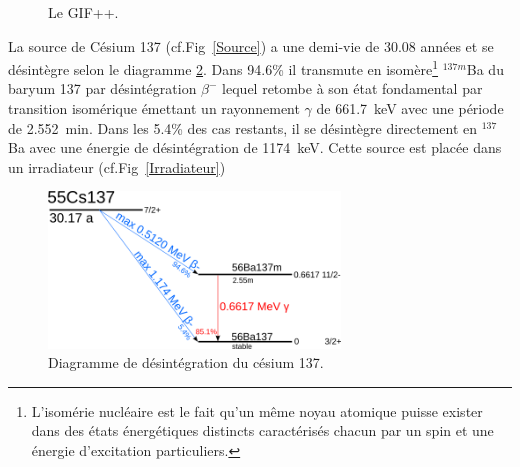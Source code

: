 \begin{figure}[ht!]
	\centering
	\hfill
	\caption{Le GIF++.}
	\label{GIF}
\end{figure}


La source de Césium \num{137} (cf.Fig~\ref{Source}) a une demi-vie de \num{30.08} années et se désintègre selon le diagramme \ref{Diagramme}. Dans \num{94.6}\% il transmute en isomère\footnote{L’isomérie nucléaire est le fait qu'un même noyau atomique puisse exister dans des états énergétiques distincts caractérisés chacun par un spin et une énergie d'excitation particuliers.} $^{137m}$Ba du baryum \num{137} par désintégration $\beta^{-}$ lequel retombe à son état fondamental par transition isomérique émettant un rayonnement $\gamma$ de \SI{661.7}{\kilo\eV} avec une période de \SI{2.552}{\minute}. Dans les \num{5.4}\% des cas restants, il se désintègre directement en $^{137}$Ba avec une énergie de désintégration de \SI{1 174}{\kilo\eV}. Cette source est placée dans un irradiateur (cf.Fig~\ref{Irradiateur})

\begin{figure}[!ht]
	\centering
	\includegraphics[width=0.69\textwidth]{GLA/Cesium137.png}
	\caption{Diagramme de désintégration du césium \num{137}.}
	\label{Diagramme}
\end{figure}


